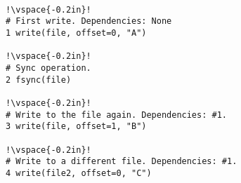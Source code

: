 \begin{lstlisting}[float=t, caption = {\textbf{Illustrating Dependencies.}
\textit{\footnotesize The
listing shows four system calls in an update protocol. The comments indicate
the dependencies of each system call. A crash state cannot reflect the effects
of a system call without reflecting the effects of it dependencies.  
}}, label = {lst-dep-example}, escapechar=!]

!\vspace{-0.2in}!
# First write. Dependencies: None 
1 write(file, offset=0, "A") 

!\vspace{-0.2in}!
# Sync operation. 
2 fsync(file)

!\vspace{-0.2in}!
# Write to the file again. Dependencies: #1.  
3 write(file, offset=1, "B")

!\vspace{-0.2in}!
# Write to a different file. Dependencies: #1.  
4 write(file2, offset=0, "C")

\end{lstlisting}

